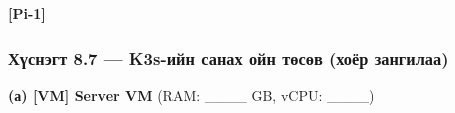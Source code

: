 \textbf{{[}Pi-1{]}}

\begin{Shaded}
\begin{Highlighting}[]
\KeywordTok{|} 
\KeywordTok{|}   \KeywordTok{|} \KeywordTok{|}  \StringTok{\textquotesingle{} \textquotesingle{}}  \KeywordTok{|} 
\end{Highlighting}
\end{Shaded}

\hypertarget{ux445ux4afux441ux43dux44dux433ux442-8.7-k3s-ux438ux439ux43d-ux441ux430ux43dux430ux445-ux43eux439ux43d-ux442ux4e9ux441ux4e9ux432-ux445ux43eux451ux440-ux437ux430ux43dux433ux438ux43bux430ux430}{%
\subsubsection{Хүснэгт 8.7 --- K3s-ийн санах ойн төсөв (хоёр зангилаа)}\label{ux445ux4afux441ux43dux44dux433ux442-8.7-k3s-ux438ux439ux43d-ux441ux430ux43dux430ux445-ux43eux439ux43d-ux442ux4e9ux441ux4e9ux432-ux445ux43eux451ux440-ux437ux430ux43dux433ux438ux43bux430ux430}}

\textbf{(а) {[}VM{]} Server VM} (RAM: \_\_\_\_ GB, vCPU: \_\_\_\_)


